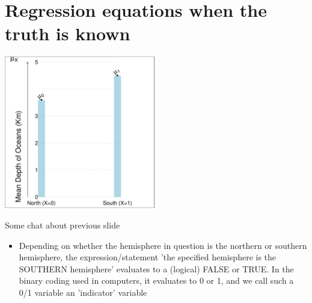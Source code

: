 \documentclass[10pt,handout]{beamer}\usepackage[]{graphicx}\usepackage[]{color}
\newenvironment{knitrout}{}{} %
\begin{document}
\section{Regression equations when the truth is known}

\begin{frame}
\end{frame}


\begin{frame}

	
\begin{knitrout}\tiny
{}\color{fgcolor}

\includegraphics[width=0.5\textwidth]{figure/unnamed-chunk-2-1} \hfill{}



\end{knitrout}
\end{frame}


\begin{frame}{Some chat about previous slide}
	\begin{itemize}
		\item Depending on whether the hemisphere in question is the northern or southern hemisphere, the expression/statement 'the specified hemisphere is the SOUTHERN hemisphere' evaluates to a (logical) FALSE or TRUE. In the binary coding used in computers, it evaluates to 0 or 1, and we call such a 0/1 variable an 'indicator' variable
	\end{itemize}
\end{frame}
\end{document}
